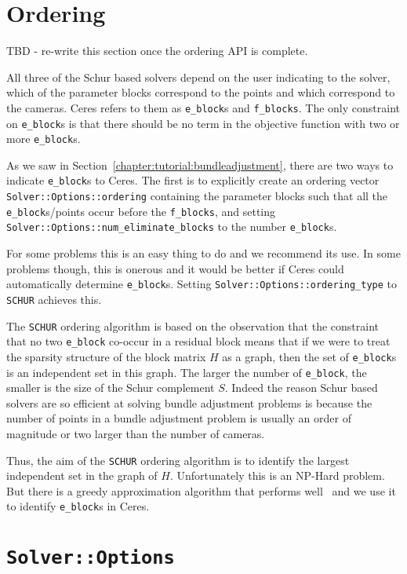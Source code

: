 \section{Ordering}
TBD - re-write this section once the ordering API is complete.

All three of the Schur based solvers depend on the user indicating to the solver, which of the parameter blocks correspond to the points and which correspond to the cameras. Ceres refers to them as \texttt{e\_block}s and \texttt{f\_blocks}. The only constraint on \texttt{e\_block}s is that there should be no term in the objective function with two or more \texttt{e\_block}s.

As we saw in Section~\ref{chapter:tutorial:bundleadjustment}, there are two ways to indicate \texttt{e\_block}s to Ceres. The first is to explicitly create an ordering vector \texttt{Solver::Options::ordering} containing the parameter blocks such that all the \texttt{e\_block}s/points occur before the \texttt{f\_blocks}, and setting \texttt{Solver::Options::num\_eliminate\_blocks} to the number \texttt{e\_block}s.

For some problems this is an easy thing to do and we recommend its use. In some problems though, this is onerous and it would be better if Ceres could automatically determine \texttt{e\_block}s. Setting \texttt{Solver::Options::ordering\_type} to \texttt{SCHUR} achieves this.

The \texttt{SCHUR} ordering algorithm is based on the observation that
the constraint that no two \texttt{e\_block} co-occur in a residual
block means that if we were to treat the sparsity structure of the
block matrix $H$ as a graph, then the set of \texttt{e\_block}s is an
independent set in this graph. The larger the number of
\texttt{e\_block}, the smaller is the size of the Schur complement $S$. Indeed the reason Schur based solvers are so efficient at solving bundle adjustment problems is because the number of points in a bundle adjustment problem is usually an order of magnitude or two larger than the number of cameras.

Thus, the aim of the \texttt{SCHUR} ordering algorithm is to identify the largest independent set in the graph of $H$. Unfortunately this is an NP-Hard problem. But there is a  greedy approximation algorithm that performs well~\cite{li2007miqr} and we use it to identify \texttt{e\_block}s in Ceres.

\section{\texttt{Solver::Options}}

